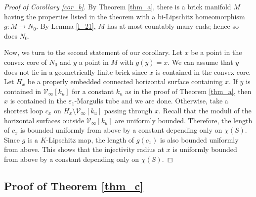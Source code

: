 \documentclass{amsart}
\theoremstyle{definition}
\numberwithin{figure}{section}
\numberwithin{equation}{section}
\def\cv{\mathcal{V}}
\begin{document}
\begin{proof}[Proof of Corollary \ref{cor_b}]
By Theorem \ref{thm_a}, there is a brick manifold $M$ having the properties listed in the theorem with a bi-Lipschitz homeomorphism $g: M \rightarrow N_0$.
By Lemma \ref{l_21}, $M$ has at most countably many ends; hence so does $N_0$.

Now, we turn to the second statement of our corollary.
Let $x$ be a point in the convex core of $N_0$ and $y$ a point in $M$ with $g(y)=x$.
We can assume that $y$ does not lie in a geometrically finite brick since $x$ is contained in  the convex core.
Let $H_x$ be a properly embedded connected horizontal surface containing $x$.
If $y$ is contained in $\cv_\infty[k_u]$ for a constant $k_u$ as in the proof of Theorem \ref{thm_a}, then $x$ is contained in the $\varepsilon_1$-Margulis tube and we are done.
Otherwise, take a shortest loop $c_x$ on $H_x \setminus \cv_\infty[k_u]$ passing through $x$.
Recall that the moduli of the horizontal surfaces outside $\cv_\infty[k_u]$ are uniformly bounded.
Therefore, the length of $c_x$ is bounded uniformly from above by a constant depending only on $\chi(S)$.
Since $g$ is a $K$-Lipschitz map, the length of $g(c_x)$ is also bounded uniformly from above.
This shows that the injectivity radius at $x$ is uniformly bounded from above by a constant depending only on $\chi(S)$.
%
%
%
\end{proof}

\subsection{Proof of Theorem \ref{thm_c}}
\end{document}
